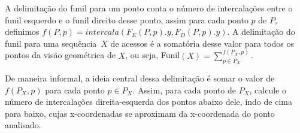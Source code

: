 A delimitação do funil para um ponto conta o número de intercalações entre o funil esquerdo e o funil direito desse ponto, assim para cada ponto $p$ de $P$, definimos $f(P,p) = intercala(F_E(P,p).y, F_D(P,p).y)$. A delimitação do funil para uma sequência~$X$ de acessos é a somatória desse valor para todos os pontos da visão geométrica de $X$, ou seja, Funil$(X) = \sum_{p \in P_X}^{f(P_X,p)}$.

De maneira informal, a ideia central dessa delimitação é somar o valor de $f(P_X,p)$ para cada ponto $p \in P_X$. Assim, para cada ponto de $P_X$, calcule o número de intercalações direita-esquerda dos pontos abaixo dele, indo de cima para baixo, cujas x-coordenadas se aproximam da x-coordenada do ponto analisado.

\begin{comment}
    \begin{figure}
        \centering
        \begin{tikzpicture}[scale=0.62]
            \draw[very thin, gray!70] (0,0) grid (8,9);
            
            \draw[fill=gray!90, gray!90] (0,0) rectangle (3,2);
            \draw[fill=gray!90, gray!90] (1,0) rectangle (5,1);

            \draw[red!90, line width=2pt] (7,3) -- (3,2);  

            \filldraw[red] (5,1) circle (6pt);
            \filldraw[red] (3,2) circle (6pt);
            \filldraw[blue] (7,3) circle (6pt);
            \filldraw[black] (1,4) circle (6pt);
            \filldraw[black] (6,5) circle (6pt);
            \filldraw[black] (3,6) circle (6pt);
            \filldraw[black] (4,7) circle (6pt);
            \filldraw[black] (2,8) circle (6pt);





            \draw[black, line width=0.5pt] (0,0) rectangle (8,9);
        \end{tikzpicture}
        \begin{tikzpicture}[scale=0.62]
            \draw[very thin, gray!70] (0,0) grid (8,9);
            
            \draw[fill=gray!90, gray!90] (8,0) rectangle (3,2);
            \draw[fill=gray!90, gray!90] (8,0) rectangle (7,3);


\end{comment}
